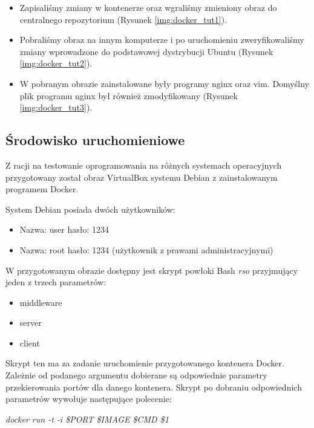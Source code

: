 \begin{itemize}
\item Zapisaliśmy zmiany w kontenerze oraz wgraliśmy zmieniony obraz do centralnego repozytorium (Rysunek \ref{img:docker_tut1}). 



\item Pobraliśmy obraz na innym komputerze i po uruchomieniu zweryfikowaliśmy zmiany wprowadzone do podstawowej dystrybucji Ubuntu (Rysunek \ref{img:docker_tut2}). 

\item W pobranym obrazie zainstalowane były programy nginx oraz vim. Domyślny plik programu nginx był również zmodyfikowany (Rysunek \ref{img:docker_tut3}).


\end{itemize}

\subsection[Środowisko uruchomieniowe]{Środowisko uruchomieniowe}

\par{Z racji na testowanie oprogramowania na różnych systemach operacyjnych przygotowany został obraz VirtualBox systemu Debian z zainstalowanym programem Docker. }

\par{System Debian posiada dwóch użytkowników:}
\begin{itemize}
\item Nazwa: user hasło: 1234
\item Nazwa: root hasło: 1234 (użytkownik z prawami administracyjnymi)
\end{itemize}


\par{W przygotowanym obrazie dostępny jest skrypt powłoki Bash \textit{rso} przyjmujący jeden z trzech parametrów: }
\begin{itemize}
\item middleware
\item server 
\item client
\end{itemize}

\par{Skrypt ten ma za zadanie uruchomienie przygotowanego kontenera Docker. Zależnie od podanego argumentu dobierane są odpowiednie parametry przekierowania portów dla danego kontenera. Skrypt po dobraniu odpowiednich parametrów wywołuje następujące polecenie:} 

\par{\textit{docker run -t -i \$PORT \$IMAGE \$CMD \$1}}

